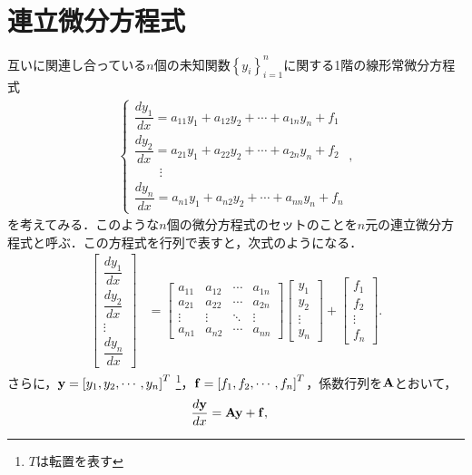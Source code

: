 \section{連立微分方程式}
%
互いに関連し合っている$n$個の未知関数$\left\{y_i\right\}_{i=1}^{n}$に関する1階の線形常微分方程式
\begin{align}
\begin{cases}
\dfrac{dy_{1}}{dx}=a_{11}y_{1}+a_{12}y_{2}+\cdots+a_{1n}y_{n}+f_{1}\\[.2cm]
\dfrac{dy_{2}}{dx}=a_{21}y_{1}+a_{22}y_{2}+\cdots+a_{2n}y_{n}+f_{2}\\[.2cm]
\qquad \vdots\\
\dfrac{dy_{n}}{dx}=a_{n1}y_{1}+a_{n2}y_{2}+\cdots+a_{nn}y_{n}+f_{n}
\end{cases},
\end{align}
を考えてみる．このような$n$個の微分方程式のセットのことを$n$元の連立微分方程式と呼ぶ．この方程式を行列で表すと，次式のようになる．
%
\begin{align}
 \left[\begin{array}{c}
\dfrac{dy_{1}}{dx}\\[.2cm]
\dfrac{dy_{2}}{dx}\\
\vdots\\
\dfrac{dy_{n}}{dx}
\end{array}\right] & =\left[\begin{array}{cccc}
a_{11} & a_{12} & \cdots & a_{1n}\\
a_{21} & a_{22} & \cdots & a_{2n}\\
\vdots & \vdots & \ddots & \vdots\\
a_{n1} & a_{n2} & \cdots & a_{nn}
\end{array}\right]\left[\begin{array}{c}
y_{1}\\
y_{2}\\
\vdots\\
y_{n}
\end{array}\right]+\left[\begin{array}{c}
f_{1}\\
f_{2}\\
\vdots\\
f_{n}
\end{array}\right]. 
\end{align}
%
さらに，${\bf y} = \left[y_1,y_2,\cdots, y_n\right]^{T}$ \footnote{$T$は転置を表す}，${\bf f} = \left[f_1,f_2,\cdots,f_n\right]^{T}$，係数行列を${\bf A}$とおいて，
%
\begin{align}
 \dfrac{d{\bf y}}{dx} & ={\bf A}{\bf y}+{\bf f}, \label{eq:PDE_simul}
\end{align}
